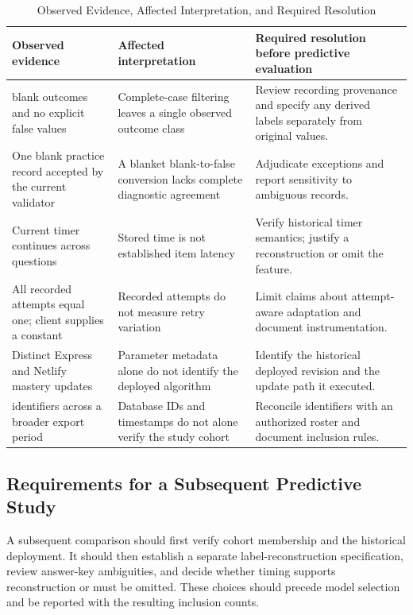\documentclass[conference]{IEEEtran}
\begin{document}
\begin{table}[t]
\caption{Observed Evidence, Affected Interpretation, and Required Resolution}
\label{tab:validity}
\centering
\small
\begin{tabular}{p{}p{}p{}}
\hline
Observed evidence & Affected interpretation & Required resolution before predictive evaluation \\
\hline
\BlankCount{} blank outcomes and no explicit false values & Complete-case filtering leaves a single observed outcome class & Review recording provenance and specify any derived labels separately from original values. \\
One blank practice record accepted by the current validator & A blanket blank-to-false conversion lacks complete diagnostic agreement & Adjudicate exceptions and report sensitivity to ambiguous records. \\
Current timer continues across questions & Stored time is not established item latency & Verify historical timer semantics; justify a reconstruction or omit the feature. \\
All recorded attempts equal one; client supplies a constant & Recorded attempts do not measure retry variation & Limit claims about attempt-aware adaptation and document instrumentation. \\
Distinct Express and Netlify mastery updates & Parameter metadata alone do not identify the deployed algorithm & Identify the historical deployed revision and the update path it executed. \\
\StudentIDCount{} identifiers across a broader export period & Database IDs and timestamps do not alone verify the study cohort & Reconcile identifiers with an authorized roster and document inclusion rules. \\
\hline
\end{tabular}
\end{table}

\subsection{Requirements for a Subsequent Predictive Study}
A subsequent comparison should first verify cohort membership and the historical deployment. It should then establish a separate label-reconstruction specification, review answer-key ambiguities, and decide whether timing supports reconstruction or must be omitted. These choices should precede model selection and be reported with the resulting inclusion counts.
\end{document}
